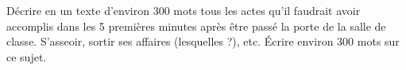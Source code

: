 
\begin{exercice}\label{exosmath-0426}

    Décrire en un texte d'environ 300 mots tous les actes qu'il faudrait avoir accomplis dans les 5 premières minutes après être passé la porte de la salle de classe. S'asseoir, sortir ses affaires (lesquelles ?), etc. Écrire environ 300 mots sur ce sujet.

\end{exercice}
